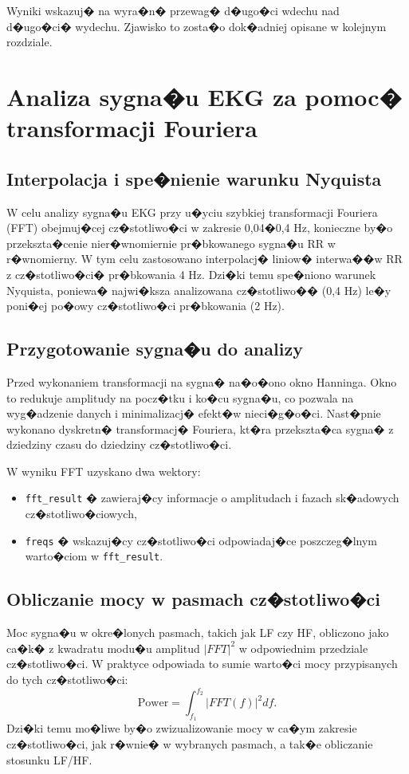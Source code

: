 Wyniki wskazuj� na wyra�n� przewag� d�ugo�ci wdechu nad d�ugo�ci� wydechu.
Zjawisko to zosta�o dok�adniej opisane w kolejnym rozdziale.

\section{Analiza sygna�u EKG za pomoc� transformacji Fouriera}

\subsection{Interpolacja i spe�nienie warunku Nyquista}
W celu analizy sygna�u EKG przy u�yciu szybkiej transformacji Fouriera (FFT)
obejmuj�cej cz�stotliwo�ci w zakresie 0,04�0,4 Hz, konieczne by�o
przekszta�cenie nier�wnomiernie pr�bkowanego sygna�u RR w r�wnomierny. W tym
celu zastosowano interpolacj� liniow� interwa��w RR z cz�stotliwo�ci�
pr�bkowania 4 Hz. Dzi�ki temu spe�niono warunek Nyquista, poniewa� najwi�ksza
analizowana cz�stotliwo�� (0,4 Hz) le�y poni�ej po�owy cz�stotliwo�ci
pr�bkowania (2 Hz).

\subsection{Przygotowanie sygna�u do analizy}
Przed wykonaniem transformacji na sygna� na�o�ono okno Hanninga. Okno to
redukuje amplitudy na pocz�tku i ko�cu sygna�u, co pozwala na wyg�adzenie
danych i minimalizacj� efekt�w nieci�g�o�ci. Nast�pnie wykonano dyskretn�
transformacj� Fouriera, kt�ra przekszta�ca sygna� z dziedziny czasu do
dziedziny cz�stotliwo�ci.

W wyniku FFT uzyskano dwa wektory:
\begin{itemize}
    \item \texttt{fft\_result} � zawieraj�cy informacje o amplitudach i fazach sk�adowych cz�stotliwo�ciowych,
    \item \texttt{freqs} � wskazuj�cy cz�stotliwo�ci odpowiadaj�ce poszczeg�lnym warto�ciom w \texttt{fft\_result}.
\end{itemize}

\subsection{Obliczanie mocy w pasmach cz�stotliwo�ci}
Moc sygna�u w okre�lonych pasmach, takich jak LF czy HF, obliczono jako ca�k� z
kwadratu modu�u amplitud \(|FFT|^2\) w odpowiednim przedziale cz�stotliwo�ci. W
praktyce odpowiada to sumie warto�ci mocy przypisanych do tych cz�stotliwo�ci:
\[
    \text{Power} = \int_{f_1}^{f_2} |FFT(f)|^2 df.
\]
Dzi�ki temu mo�liwe by�o zwizualizowanie mocy w ca�ym zakresie cz�stotliwo�ci,
jak r�wnie� w wybranych pasmach, a tak�e obliczanie stosunku LF/HF.


